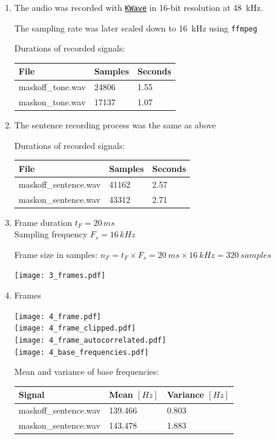 \documentclass[a4paper, 11pt]{article}
\begin{document}
	\begin{enumerate}
		\item
		The audio was recorded with \texttt{\href{https://apps.kde.org/en/kwave}{KWave}} in 16-bit resolution at 48~kHz.

		The sampling rate was later scaled down to 16~kHz using \texttt{ffmpeg}

		Durations of recorded signals: \\
		\begin{tabular}{ | l | l | l | }
			\hline
			\textbf{File} & \textbf{Samples} & \textbf{Seconds} \\ \hline
			maskoff\_tone.wav & 24806            & 1.55             \\ \hline
			maskon\_tone.wav  & 17137            & 1.07             \\ \hline
		\end{tabular}

		\item
		The sentence recording process was the same as above

		Durations of recorded signals: \\
		\begin{tabular}{ | l | l | l | }
			\hline
			\textbf{File}      & \textbf{Samples} & \textbf{Seconds} \\ \hline
			maskoff\_sentence.wav & 41162            & 2.57             \\ \hline
			maskon\_sentence.wav  & 43312            & 2.71             \\ \hline
		\end{tabular}

		\newpage
		\item
		Frame duration $t_F = 20\,ms$ \\
		Sampling frequency $F_s = 16\,kHz$

		Frame size in samples: $n_F = t_F \times F_s = 20~ms \times 16~kHz = 320~samples$

		\texttt{[image: 3\_frames.pdf]}

		\item
		Frames

		\texttt{[image: 4\_frame.pdf]} \\
		\texttt{[image: 4\_frame\_clipped.pdf]} \\
		\texttt{[image: 4\_frame\_autocorrelated.pdf]} \\
		\texttt{[image: 4\_base\_frequencies.pdf]}

		\newpage
		Mean and variance of base frequencies: \\
		\begin{tabular}{ | l | l | l | }
			\hline
			\textbf{Signal}    & \textbf{Mean} $[Hz]$ & \textbf{Variance} $[Hz]$ \\ \hline
			maskoff\_sentence.wav & 139.466              & 0.803                    \\ \hline
			maskon\_sentence.wav  & 143.478              & 1.883                    \\ \hline
		\end{tabular}


\end{enumerate}
\end{document}
